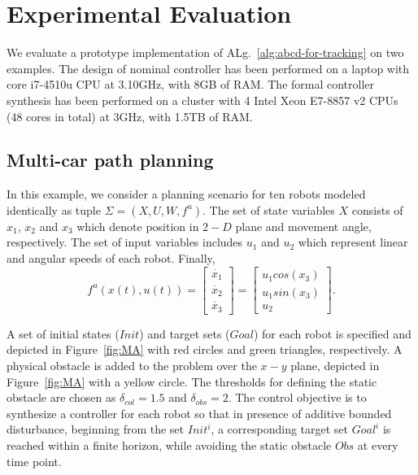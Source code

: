 
\section{Experimental Evaluation}\label{sec:experiments}
We evaluate a prototype implementation of ALg.~\ref{alg:abcd-for-tracking}
on two examples. 
The design of nominal controller has been performed on a laptop with core i7-4510u CPU at 3.10GHz, with 8GB of
RAM.
The formal controller synthesis has been performed
on a cluster with 4 Intel Xeon E7-8857 v2 CPUs (48 cores in total) at 3GHz, with 1.5TB of
RAM.

\subsection{Multi-car path planning}\label{sec:MultiAgent}

In this example, we consider a planning scenario for ten robots modeled identically as tuple $\Sigma=(X,U,W,f^u)$. The set of state variables $X$ consists of $x_1$, $x_2$ and $x_3$ which denote position in $2-D$ plane and movement angle, respectively. The set of input variables includes $u_1$ and $u_2$ which represent linear and angular speeds of each robot. Finally,
\begin{equation}\label{eq:unicycle_ss}
	f^{u}(x(t),u(t))=
	\begin{bmatrix}
		\dot{x_1}\\
		\dot{x_2}\\
		\dot{x_3}
	\end{bmatrix}=
	\begin{bmatrix}
		u_1cos(x_3)\\
		u_1sin(x_3)\\
		u_2
	\end{bmatrix}.
\end{equation}

A set of initial states ($Init$) and target sets ($Goal$) for each robot is specified and depicted in Figure~\ref{fig:MA} with red circles and green triangles, respectively. A physical obstacle is added to the problem over the $x-y$ plane, depicted in Figure~\ref{fig:MA} with a yellow circle. The thresholds for defining the static obstacle are chosen as $\delta_{col}=1.5$ and $\delta_{obs}=2$. The control objective is to synthesize a controller for each robot so that in presence of additive bounded disturbance, beginning from the set $Init^i$, a corresponding target set $Goal^i$ is reached within a finite horizon, while avoiding the static obstacle $Obs$ at every time point. 

